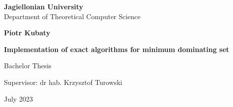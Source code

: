 \begin{titlepage}
\begin{center}

\large
\textbf{Jagiellonian University}\\
Department of Theoretical Computer Science\\

\vspace{1.5cm}

\Large
\textbf{Piotr Kubaty}

\vspace*{2cm}

\textbf{\LARGE Implementation of exact algorithms for minimum dominating set}

\vspace{0.5cm}
\large

\vfill
\Large
Bachelor Thesis

\vfill
\Large
Supervisor: dr hab. Krzysztof Turowski

\vspace{0.8cm}

July 2023
		
\end{center}
\end{titlepage}